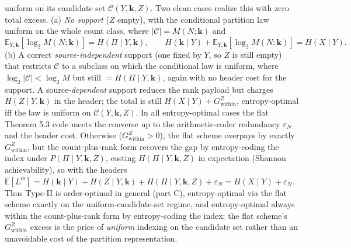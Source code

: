 \documentclass[
]{article}
\begin{document}
\begin{itemize}
uniform on its candidate set $\mathcal{C}(Y, \mathbf{k}, Z)$. Two clean
cases realize this with zero total excess. (a) \emph{No support} ($Z$
empty), with the conditional partition law uniform on the whole count
class, where $|\mathcal{C}| = M(N; \mathbf{k})$ and
\[
\mathbb{E}_{Y, \mathbf{k}}\!\left[\log_2 M(N; \mathbf{k})\right] = H(\Pi \mid Y, \mathbf{k}),
\qquad H(\mathbf{k} \mid Y) + \mathbb{E}_{Y, \mathbf{k}}\!\left[\log_2 M(N; \mathbf{k})\right] = H(X \mid Y).
\]
(b) A correct \emph{source-independent} support (one fixed by $Y$, so $Z$
is still empty) that restricts $\mathcal{C}$ to a subclass on which the
conditional law is uniform, where $\log_2 |\mathcal{C}| < \log_2 M$ but
still $= H(\Pi \mid Y, \mathbf{k})$, again with no header cost for the
support. A source-\emph{dependent} support reduces the rank payload but
charges $H(Z \mid Y, \mathbf{k})$ in the header; the total is still
$H(X \mid Y) + G_{\mathrm{within}}^{Z}$, entropy-optimal iff the law is
uniform on $\mathcal{C}(Y, \mathbf{k}, Z)$. In all entropy-optimal cases
the flat Theorem 5.3 code meets the converse up to the arithmetic-coder
redundancy $\varepsilon_N$ and the header cost. Otherwise
($G_{\mathrm{within}}^{Z} > 0$), the flat scheme overpays by exactly
$G_{\mathrm{within}}^{Z}$, but the count-plus-rank form recovers the gap
by entropy-coding the index under $P(\Pi \mid Y, \mathbf{k}, Z)$, costing
$H(\Pi \mid Y, \mathbf{k}, Z)$ in expectation (Shannon achievability), so
with the headers $\mathbb{E}[L^{\mathrm{cr}}] = H(\mathbf{k} \mid Y) + H(Z \mid Y, \mathbf{k}) + H(\Pi \mid Y, \mathbf{k}, Z) + \varepsilon_N = H(X \mid Y) + \varepsilon_N$.
Thus Type-II is order-optimal in general (part C), entropy-optimal via
the flat scheme exactly on the uniform-candidate-set regime, and
entropy-optimal always within the count-plus-rank form by entropy-coding
the index; the flat scheme's $G_{\mathrm{within}}^{Z}$ excess is the price
of \emph{uniform} indexing on the candidate set rather than an
unavoidable cost of the partition representation.
\end{itemize}
\end{document}
